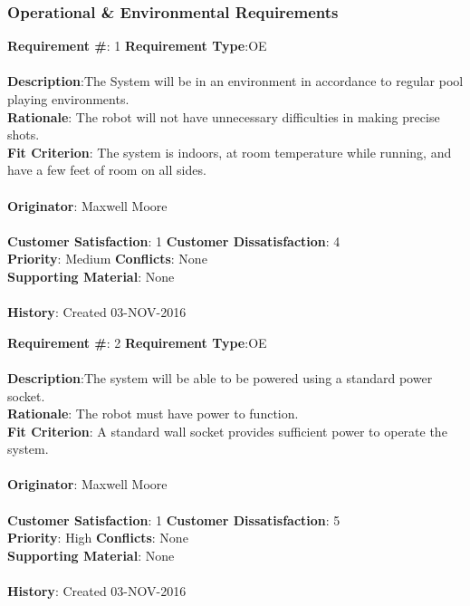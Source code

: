 \documentclass[titlepage]{article}
\begin{document}
\subsubsection{Operational \& Environmental Requirements}
\begin{framed}
	\noindent\textbf{Requirement \#}: 1 \hfill \textbf{Requirement Type}:OE \hfill\\\\
	\noindent\textbf{Description}:The System will be in an environment in accordance to regular pool playing environments.\\
	\textbf{Rationale}: The robot will not have unnecessary difficulties in making precise shots.\\
	\textbf{Fit Criterion}: The system is indoors, at room temperature while running, and have a few feet of room on all sides.\\\\
	\textbf{Originator}: Maxwell Moore\\\\
	\noindent\textbf{Customer Satisfaction}: 1 \hfill 	\textbf{Customer Dissatisfaction}: 4 \hfill\\
	\textbf{Priority}: Medium \hfill \textbf{Conflicts}: None \hfill\\
	\textbf{Supporting Material}: None\\\\
	\noindent\textbf{History}: Created 03-NOV-2016
\end{framed}

\begin{framed}
	\noindent\textbf{Requirement \#}: 2 \hfill \textbf{Requirement Type}:OE \hfill\\\\
	\noindent\textbf{Description}:The system will be able to be powered using a standard power socket.\\
	\textbf{Rationale}: The robot must have power to function.\\
	\textbf{Fit Criterion}: A standard wall socket provides sufficient power to operate the system.\\\\
	\textbf{Originator}: Maxwell Moore\\\\
	\noindent\textbf{Customer Satisfaction}: 1 \hfill 	\textbf{Customer Dissatisfaction}: 5 \hfill\\
	\textbf{Priority}: High \hfill \textbf{Conflicts}: None \hfill\\
	\textbf{Supporting Material}: None\\\\
	\noindent\textbf{History}: Created 03-NOV-2016
\end{framed}
\end{document}
